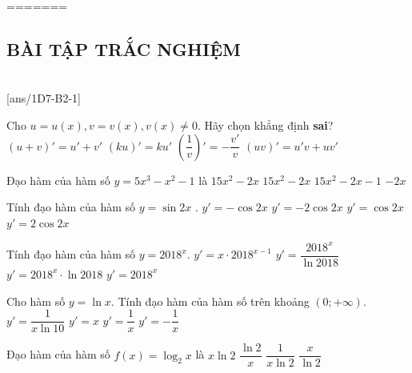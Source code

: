 
=======
\subsection{BÀI TẬP TRẮC NGHIỆM}
 \\
\setcounter{ex}{0}
[ans/1D7-B2-1]

\begin{ex}%
	Cho $ u=u(x), v=v(x), v(x)\ne 0 $. Hãy chọn khẳng định \textbf{sai}?
	\choice
	{$(u+v)'=u'+v'$}
	{$(ku)'=ku'$}
	{\True $\left(\dfrac{1}{v}\right)'=-\dfrac{v'}{v}$}
	{$(uv)'=u'v+uv'$}
\end{ex}

\begin{ex}
	Đạo hàm của hàm số $y=5x^3-x^2-1$ là
	\choice
	{\True $15x^2-2x$}
	{$15x^2-2x$}
	{$15x^2-2x-1$}
	{$-2x$}
\end{ex}

\begin{ex}%
	Tính đạo hàm của hàm số $y=\sin 2x$ .
	\choice
	{$y'=-\cos 2x$}
	{$y'=-2\cos 2x$}
	{$y'=\cos 2x$}
	{\True $y'=2\cos 2x$}
\end{ex}


\begin{ex}
	Tính đạo hàm của hàm số $ y=2018^x $.
	\choice
	{$ y'=x\cdot 2018^{x-1} $}
	{$ y'=\dfrac{2018^x}{\ln 2018} $}
	{\True $ y'=2018^x \cdot \ln 2018 $}
	{$ y'=2018^x $}
\end{ex}

\begin{ex}
	Cho hàm số $y=\ln x$. Tính đạo hàm của hàm số trên khoảng $(0; +\infty)$.
	\choice
	{$y'=\dfrac{1}{x\ln10}$}
	{$y'=x$}
	{\True $y'=\dfrac{1}{x}$}
	{$y'=-\dfrac{1}{x}$}
\end{ex}

\begin{ex}
	Đạo hàm của hàm số $f(x)=\log_2 x$ là
	\choice
	{$x\ln2$}
	{$\dfrac{\ln2}{x}$}
	{\True $\dfrac{1}{x\ln2}$}
	{$\dfrac{x}{\ln2}$}
\end{ex}

